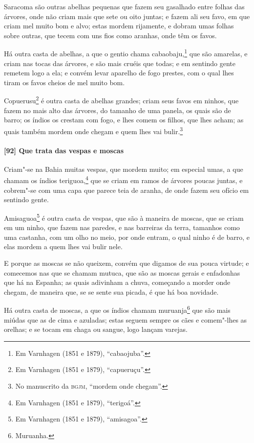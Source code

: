 Saracoma são outras abelhas pequenas que fazem seu gasalhado entre folhas das árvores,
onde não criam mais que sete ou oito juntas; e fazem ali seu favo, em que criam mel muito
bom e alvo; estas mordem rijamente, e dobram umas folhas sobre outras, que tecem com uns
fios como aranhas, onde têm os favos.

Há outra casta de abelhas, a que o gentio chama cabaobaju,\footnote{ Em Varnhagen (1851 e
1879), ``cabaojuba''.} que são amarelas, e criam nas tocas das árvores, e são mais cruéis
que todas; e em sentindo gente remetem logo a ela; e convém levar aparelho de fogo
prestes, com o qual lhes tiram os favos cheios de mel muito bom.

Copuerusu\footnote{ Em Varnhagen (1851 e 1879), ``capueruçu''.} é outra casta de abelhas
grandes; criam seus favos em ninhos, que fazem no mais alto das árvores, do tamanho de uma
panela, os quais são de barro; os índios os crestam com fogo, e lhes comem os filhos, que
lhes acham; as quais também mordem onde chegam e quem lhes vai bulir.\footnote{ No
manuscrito da \textsc{bgjm}, ``mordem onde chegam''.}

\paragraph{[92] Que trata das vespas e moscas}\quad
Criam"-se na Bahia muitas vespas, que mordem muito; em especial umas, a que chamam os
índios teriguoa,\footnote{ Em Varnhagen (1851 e 1879), ``terigoá''.} que se criam em ramos
de árvores poucas juntas, e cobrem"-se com uma capa que parece teia de aranha, de onde
fazem seu ofício em sentindo gente.

Amisaguoa\footnote{ Em Varnhagen (1851 e 1879), ``amisagoa''.} é outra casta de vespas,
que são à maneira de moscas, que se criam em um ninho, que fazem nas paredes, e nas
barreiras da terra, tamanhos como uma castanha, com um olho no meio, por onde entram, o
qual ninho é de barro, e elas mordem a quem lhes vai bulir nele.

E porque as moscas se não queixem, convém que digamos de sua pouca virtude; e comecemos
nas que se chamam mutuca, que são as moscas gerais e enfadonhas que há na Espanha; as
quais adivinham a chuva, começando a morder onde chegam, de maneira que, se se sente sua
picada, é que há boa novidade.

Há outra casta de moscas, a que os índios chamam muruanja\footnote{ Muruanha.} que são
mais miúdas que as de cima e azuladas; estas seguem sempre os cães e comem"-lhes as
orelhas; e se tocam em chaga ou sangue, logo lançam varejas.


